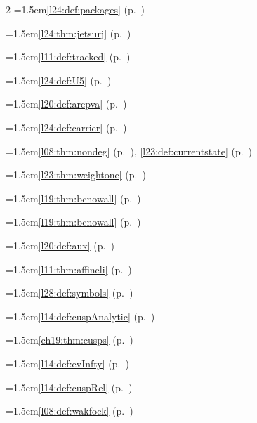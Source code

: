 \begin{multicols}{2}
\hangindent=1.5em\quad \ref{l24:def:packages} (p.~\pageref{l24:def:packages})\par
\hangindent=1.5em\quad \ref{l24:thm:jetsurj} (p.~\pageref{l24:thm:jetsurj})\par
\hangindent=1.5em\quad \ref{l11:def:tracked} (p.~\pageref{l11:def:tracked})\par
\hangindent=1.5em\quad \ref{l24:def:U5} (p.~\pageref{l24:def:U5})\par
\hangindent=1.5em\quad \ref{l20:def:arcpva} (p.~\pageref{l20:def:arcpva})\par
\hangindent=1.5em\quad \ref{l24:def:carrier} (p.~\pageref{l24:def:carrier})\par
\hangindent=1.5em\quad \ref{l08:thm:nondeg} (p.~\pageref{l08:thm:nondeg}), \ref{l23:def:currentstate} (p.~\pageref{l23:def:currentstate})\par
\hangindent=1.5em\quad \ref{l23:thm:weightone} (p.~\pageref{l23:thm:weightone})\par
\hangindent=1.5em\quad \ref{l19:thm:bcnowall} (p.~\pageref{l19:thm:bcnowall})\par
\hangindent=1.5em\quad \ref{l19:thm:bcnowall} (p.~\pageref{l19:thm:bcnowall})\par
\hangindent=1.5em\quad \ref{l20:def:aux} (p.~\pageref{l20:def:aux})\par
\hangindent=1.5em\quad \ref{l11:thm:affineli} (p.~\pageref{l11:thm:affineli})\par
\hangindent=1.5em\quad \ref{l28:def:symbols} (p.~\pageref{l28:def:symbols})\par
\hangindent=1.5em\quad \ref{l14:def:cuspAnalytic} (p.~\pageref{l14:def:cuspAnalytic})\par
\hangindent=1.5em\quad \ref{ch19:thm:cusps} (p.~\pageref{ch19:thm:cusps})\par
\hangindent=1.5em\quad \ref{l14:def:evInfty} (p.~\pageref{l14:def:evInfty})\par
\hangindent=1.5em\quad \ref{l14:def:cuspRel} (p.~\pageref{l14:def:cuspRel})\par
\hangindent=1.5em\quad \ref{l08:def:wakfock} (p.~\pageref{l08:def:wakfock})\par

\end{multicols}
